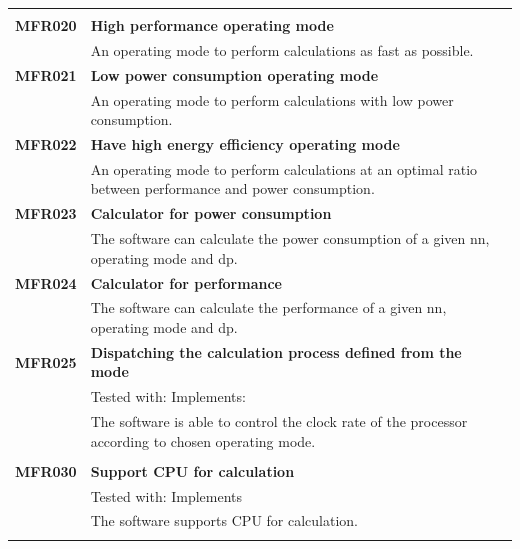 \documentclass[parskip=full]{scrartcl}
\begin{document}
\begin{tabular}{p{2cm}p{12cm}}
& \\
\textbf{MFR020} & \textbf{High \gls{performance} operating mode}\\                                     
& An operating mode to perform calculations as fast as possible.\\
\textbf{MFR021} & \textbf{Low \gls{power consumption} operating mode}\\                                     
& An operating mode to perform calculations with low \gls{power consumption}.\\
\textbf{MFR022} & \textbf{Have high energy efficiency operating mode}\\                                     
& An operating mode to perform calculations at an optimal ratio between \gls{performance} and \gls{power consumption}.\\
\textbf{MFR023} & \textbf{Calculator for \gls{power consumption}}\\                                     
& The software can calculate the \gls{power consumption} of a given \gls{nn}, operating mode and \gls{dp}.\\
\textbf{MFR024} & \textbf{Calculator for \gls{performance}}\\                                     
& The software can calculate the \gls{performance} of a given \gls{nn}, operating mode and \gls{dp}.\\
\textbf {MFR025} & \textbf{Dispatching the calculation process defined from the mode}\\
& Tested with: Implements: \\
& The software is able to control the clock rate of the processor according to chosen operating mode. \\
& \\
\textbf {MFR030} & \textbf{Support CPU for calculation} \\
& Tested with: Implements \\
& The software supports CPU for calculation. \\
& \\
\end{tabular}
\newpage
\end{document}
